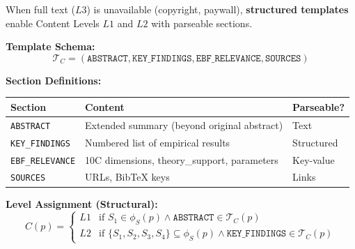 
\begin{tcolorbox}[colback=blue!5!white, colframe=blue!75!black,
    title=\textbf{Definition 2a: L1/L2 Template Structure $\mathcal{T}_{L1}, \mathcal{T}_{L2}$}]

When full text ($L3$) is unavailable (copyright, paywall), \textbf{structured templates}
enable Content Levels $L1$ and $L2$ with parseable sections.

\textbf{Template Schema:}
\begin{equation}
\mathcal{T}_C = (\texttt{ABSTRACT}, \texttt{KEY\_FINDINGS}, \texttt{EBF\_RELEVANCE}, \texttt{SOURCES})
\end{equation}

\textbf{Section Definitions:}
\begin{table}[H]
\centering
\begin{tabular}{@{}lp{5cm}l@{}}
\toprule
\textbf{Section} & \textbf{Content} & \textbf{Parseable?} \\
\midrule
\texttt{ABSTRACT} & Extended summary (beyond original abstract) & Text \\
\texttt{KEY\_FINDINGS} & Numbered list of empirical results & Structured \\
\texttt{EBF\_RELEVANCE} & 10C dimensions, theory\_support, parameters & Key-value \\
\texttt{SOURCES} & URLs, BibTeX keys & Links \\
\bottomrule
\end{tabular}
\end{table}

\textbf{Level Assignment (Structural):}
\begin{equation}
C(p) = \begin{cases}
L1 & \text{if } S_1 \in \phi_S(p) \land \texttt{ABSTRACT} \in \mathcal{T}_C(p) \\
L2 & \text{if } \{S_1, S_2, S_3, S_4\} \subseteq \phi_S(p) \land \texttt{KEY\_FINDINGS} \in \mathcal{T}_C(p)
\end{cases}
\end{equation}

\end{tcolorbox}

